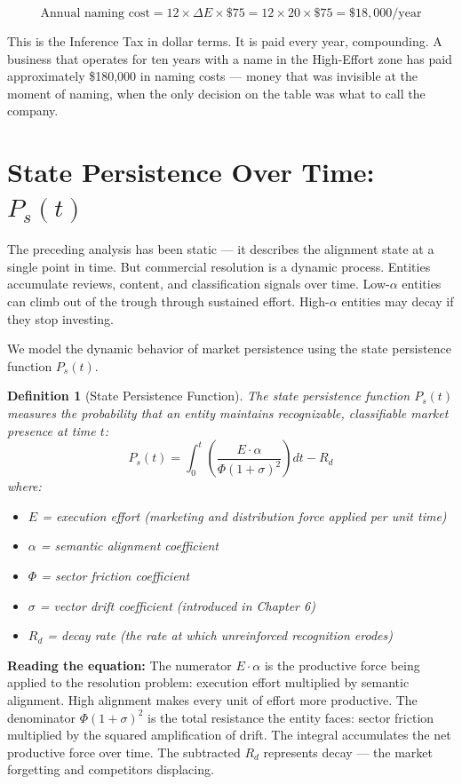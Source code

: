 \documentclass[12pt, openany]{book}
\theoremstyle{thmstyle}
\theoremstyle{defstyle}
\newtheorem{definition}{Definition}[chapter]
\newcommand{\Ps}{P_s}
\begin{document}
\[
\text{Annual naming cost} = 12 \times \Delta E \times \$75 = 12 \times 20 \times \$75 = \$18{,}000/\text{year}
\]

This is the Inference Tax in dollar terms. It is paid every year, compounding. A business that operates for ten years with a name in the High-Effort zone has paid approximately \$180,000 in naming costs --- money that was invisible at the moment of naming, when the only decision on the table was what to call the company.

\section{State Persistence Over Time: $P_s(t)$}

The preceding analysis has been static --- it describes the alignment state at a single point in time. But commercial resolution is a dynamic process. Entities accumulate reviews, content, and classification signals over time. Low-$\alpha$ entities can climb out of the trough through sustained effort. High-$\alpha$ entities may decay if they stop investing.

We model the dynamic behavior of market persistence using the state persistence function $\Ps(t)$.

\begin{definition}[State Persistence Function]
The state persistence function $P_s(t)$ measures the probability that an entity maintains recognizable, classifiable market presence at time $t$:
\begin{equation}
P_s(t) = \int_0^t \left(\frac{E \cdot \alpha}{\Phi(1+\sigma)^2}\right) dt - R_d
\label{eq:persistence}
\end{equation}
where:
\begin{itemize}[leftmargin=1.5em]
  \item $E$ = execution effort (marketing and distribution force applied per unit time)
  \item $\alpha$ = semantic alignment coefficient
  \item $\Phi$ = sector friction coefficient
  \item $\sigma$ = vector drift coefficient (introduced in Chapter 6)
  \item $R_d$ = decay rate (the rate at which unreinforced recognition erodes)
\end{itemize}
\end{definition}

\textbf{Reading the equation:} The numerator $E \cdot \alpha$ is the productive force being applied to the resolution problem: execution effort multiplied by semantic alignment. High alignment makes every unit of effort more productive. The denominator $\Phi(1+\sigma)^2$ is the total resistance the entity faces: sector friction multiplied by the squared amplification of drift. The integral accumulates the net productive force over time. The subtracted $R_d$ represents decay --- the market forgetting and competitors displacing.
\end{document}
